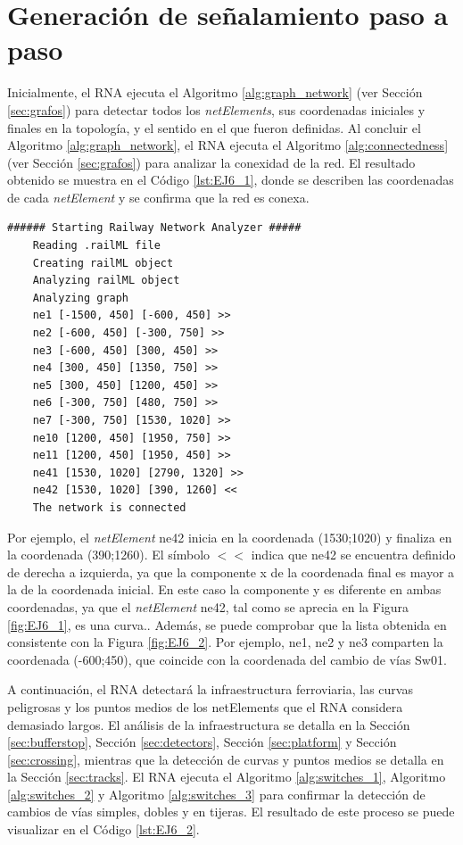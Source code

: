 \section{Generación de señalamiento paso a paso}

	Inicialmente, el RNA ejecuta el Algoritmo \ref{alg:graph_network} (ver Sección \ref{sec:grafos}) para detectar todos los \textit{netElements}, sus coordenadas iniciales y finales en la topología, y el sentido en el que fueron definidas. Al concluir el Algoritmo \ref{alg:graph_network}, el RNA ejecuta el Algoritmo \ref{alg:connectedness} (ver Sección \ref{sec:grafos}) para analizar la conexidad de la red. El resultado obtenido se muestra en el Código \ref{lst:EJ6_1}, donde se describen las coordenadas de cada \textit{netElement} y se confirma que la red es conexa.
	
	\begin{lstlisting}[language = {}, caption = Detección de \textit{netElements} por parte del RNA , label = {lst:EJ6_1}]
	###### Starting Railway Network Analyzer #####
	Reading .railML file
	Creating railML object
	Analyzing railML object
	Analyzing graph
	ne1 [-1500, 450] [-600, 450] >>
	ne2 [-600, 450] [-300, 750] >> 
	ne3 [-600, 450] [300, 450] >>
	ne4 [300, 450] [1350, 750] >>
	ne5 [300, 450] [1200, 450] >>
	ne6 [-300, 750] [480, 750] >>
	ne7 [-300, 750] [1530, 1020] >>
	ne10 [1200, 450] [1950, 750] >>
	ne11 [1200, 450] [1950, 450] >>
	ne41 [1530, 1020] [2790, 1320] >>
	ne42 [1530, 1020] [390, 1260] <<
	The network is connected
	\end{lstlisting}
	
	Por ejemplo, el \textit{netElement} ne42 inicia en la coordenada (1530;1020) y finaliza en la coordenada (390;1260). El símbolo $<<$ indica que ne42 se encuentra definido de derecha a izquierda, ya que la componente x de la coordenada final es mayor a la de la coordenada inicial. En este caso la componente y es diferente en ambas coordenadas, ya que el \textit{netElement} ne42, tal como se aprecia en la Figura \ref{fig:EJ6_1}, es una curva.. Además, se puede comprobar que la lista obtenida en consistente con la Figura \ref{fig:EJ6_2}. Por ejemplo, ne1, ne2 y ne3 comparten la coordenada (-600;450), que coincide con la coordenada del cambio de vías Sw01.
	
	A continuación, el RNA detectará la infraestructura ferroviaria, las curvas peligrosas y los puntos medios de los netElements que el RNA considera demasiado largos. El análisis de la infraestructura se detalla en la Sección \ref{sec:bufferstop}, Sección \ref{sec:detectors}, Sección \ref{sec:platform} y Sección \ref{sec:crossing}, mientras que la detección de curvas y puntos medios se detalla en la Sección \ref{sec:tracks}. El RNA ejecuta el Algoritmo \ref{alg:switches_1}, Algoritmo \ref{alg:switches_2} y Algoritmo \ref{alg:switches_3} para confirmar la detección de cambios de vías simples, dobles y en tijeras. El resultado de este proceso se puede visualizar en el Código \ref{lst:EJ6_2}.
	
